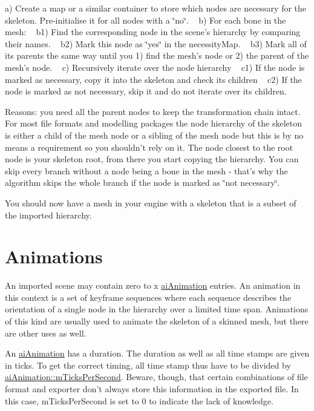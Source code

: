 a) Create a map or a similar container to store which nodes are necessary for the skeleton. Pre-\/initialise it for all nodes with a \char`\"{}no\char`\"{}. ~\newline
 b) For each bone in the mesh\+: ~\newline
 b1) Find the corresponding node in the scene's hierarchy by comparing their names. ~\newline
 b2) Mark this node as \char`\"{}yes\char`\"{} in the necessity\+Map. ~\newline
 b3) Mark all of its parents the same way until you 1) find the mesh's node or 2) the parent of the mesh's node. ~\newline
 c) Recursively iterate over the node hierarchy ~\newline
 c1) If the node is marked as necessary, copy it into the skeleton and check its children ~\newline
 c2) If the node is marked as not necessary, skip it and do not iterate over its children. ~\newline


Reasons\+: you need all the parent nodes to keep the transformation chain intact. For most file formats and modelling packages the node hierarchy of the skeleton is either a child of the mesh node or a sibling of the mesh node but this is by no means a requirement so you shouldn't rely on it. The node closest to the root node is your skeleton root, from there you start copying the hierarchy. You can skip every branch without a node being a bone in the mesh -\/ that's why the algorithm skips the whole branch if the node is marked as \char`\"{}not necessary\char`\"{}.

You should now have a mesh in your engine with a skeleton that is a subset of the imported hierarchy.\hypertarget{data_anims}{}\section{Animations}\label{data_anims}
An imported scene may contain zero to x \hyperlink{structai_animation}{ai\+Animation} entries. An animation in this context is a set of keyframe sequences where each sequence describes the orientation of a single node in the hierarchy over a limited time span. Animations of this kind are usually used to animate the skeleton of a skinned mesh, but there are other uses as well.

An \hyperlink{structai_animation}{ai\+Animation} has a duration. The duration as well as all time stamps are given in ticks. To get the correct timing, all time stamp thus have to be divided by \hyperlink{structai_animation_afd26a40c3f16b6aa6e150effa3eaeab1}{ai\+Animation\+::m\+Ticks\+Per\+Second}. Beware, though, that certain combinations of file format and exporter don't always store this information in the exported file. In this case, m\+Ticks\+Per\+Second is set to 0 to indicate the lack of knowledge.

